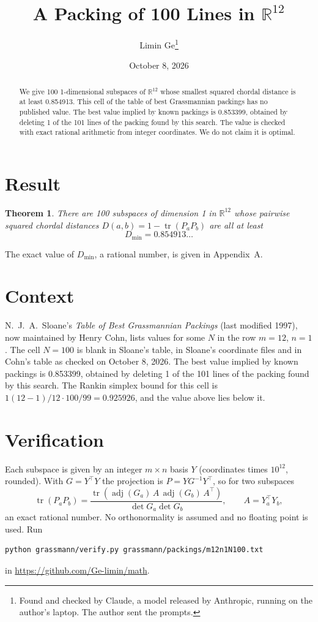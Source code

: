 \documentclass[11pt,a4paper]{article}
\title{A Packing of 100 Lines in $\mathbb{R}^{12}$}
\author{Limin Ge\thanks{Found and checked by Claude, a model released by Anthropic, running on the author's laptop. The author sent the prompts.}}
\date{October 8, 2026}
\newtheorem*{theorem}{Theorem}
\begin{document}
\maketitle
\begin{abstract}
We give 100 1-dimensional subspaces of $\mathbb{R}^{12}$ whose smallest squared chordal distance is at least 0.854913. This cell of the table of best Grassmannian packings has no published value. The best value implied by known packings is 0.853399, obtained by deleting 1 of the 101 lines of the packing found by this search. The value is checked with exact rational arithmetic from integer coordinates. We do not claim it is optimal.
\end{abstract}

\section{Result}
\begin{theorem}
There are 100 subspaces of dimension 1 in $\mathbb{R}^{12}$ whose pairwise squared chordal distances $D(a,b) = 1 - \operatorname{tr}(P_aP_b)$ are all at least
\[ D_{\min} = 0.854913\ldots \]
\end{theorem}
The exact value of $D_{\min}$, a rational number, is given in Appendix~A.


\section{Context}
N.~J.~A.~Sloane's \emph{Table of Best Grassmannian Packings} (last modified 1997), now maintained by Henry Cohn, lists values for some $N$ in the row $m=12$, $n=1$. The cell $N=100$ is blank in Sloane's table, in Sloane's coordinate files and in Cohn's table as checked on October 8, 2026. The best value implied by known packings is 0.853399, obtained by deleting 1 of the 101 lines of the packing found by this search. The Rankin simplex bound for this cell is $1(12-1)/12\cdot 100/99 = 0.925926$, and the value above lies below it.


\section{Verification}
Each subspace is given by an integer $m\times n$ basis $Y$ (coordinates times $10^{12}$, rounded). With $G=Y^\top Y$ the projection is $P=YG^{-1}Y^\top$, so for two subspaces
\[ \operatorname{tr}(P_aP_b)=\frac{\operatorname{tr}(\operatorname{adj}(G_a)\,A\,\operatorname{adj}(G_b)\,A^\top)}{\det G_a\det G_b},\qquad A=Y_a^\top Y_b, \]
an exact rational number. No orthonormality is assumed and no floating point is used. Run
\begin{verbatim}
python grassmann/verify.py grassmann/packings/m12n1N100.txt
\end{verbatim}
in \url{https://github.com/Ge-limin/math}.
\end{document}

